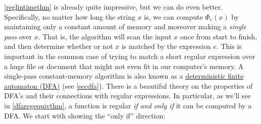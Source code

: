 \cref{reglintimethm} is already quite impressive, but we can do even
better. Specifically, no matter how long the string \(x\) is, we can
compute \(\Phi_e(x)\) by maintaining only a constant amount of memory
and moreover making a \emph{single pass} over \(x\). That is, the
algorithm will scan the input \(x\) once from start to finish, and then
determine whether or not \(x\) is matched by the expression \(e\). This
is important in the common case of trying to match a short regular
expression over a huge file or document that might not even fit in our
computer's memory. A single-pass constant-memory algorithm is also known
as a \href{https://goo.gl/SG6DS7}{deterministic finite automaton (DFA)}
(see \cref{secdfa}). There is a beautiful theory on the properties of
DFA's and their connections with regular expressions. In particular, as
we'll see in \cref{dfaregequivthm}, a function is regular \emph{if and
only if} it can be computed by a DFA. We start with showing the ``only
if'' direction:

\hypertarget{DFAforREGthm}{}


